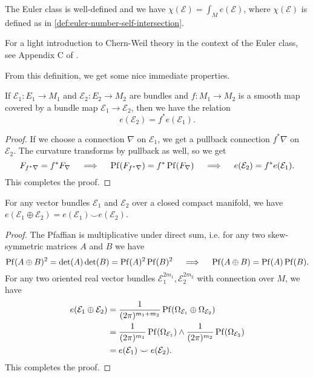 \begin{theorem}
  The Euler class is well-defined and we have $\chi(\mathcal{E})=\int_M e(\mathcal{E})$, where $\chi(\mathcal{E})$ is defined as in \cref{def:euler-number-self-intersection}.
\end{theorem}

For a light introduction to Chern-Weil theory in the context of the Euler class, see Appendix C of \cite{milnorstasheff1974}.

From this definition, we get some nice immediate properties. 
\begin{proposition}\label{prop:euler-class-naturality}
  If $\mathcal{E}_1 : E_1 \to M_1$ and $\mathcal{E}_2 : E_2 \to M_2$ are bundles and 
  $f : M_1 \to M_2$ is a smooth map covered by a bundle map $\mathcal{E}_1\to \mathcal{E}_2$, then we have the relation
  \[
      e(\mathcal{E}_2) = f^* e(\mathcal{E}_1).
  \]
\end{proposition}
\begin{proof}
  If we choose a connection $\nabla$ on $\mathcal{E}_1$, we get a pullback connection $f^*\nabla$ on $\mathcal{E}_2$. The curvature transforms by pullback as well, so we get
  \[
      F_{f^*\nabla} = f^* F_{\nabla} \quad\implies\quad \operatorname{Pf}(F_{f^*\nabla}) = f^*\operatorname{Pf}(F_\nabla) \quad\implies\quad e(\mathcal{E}_2) = f^* e(\mathcal{E}_1). 
  \]
  This completes the proof.
\end{proof}

\begin{proposition}
  For any vector bundles $\mathcal{E}_1$ and $\mathcal{E}_2$ over a closed compact manifold, we have $e(\mathcal{E}_1\oplus \mathcal{E}_2)=e(\mathcal{E}_1)\smile e(\mathcal{E}_2)$.
\end{proposition}
\begin{proof}
The Pfaffian is multiplicative under direct sum, i.e. for any two skew-symmetric matrices $A$ and $B$ we have
\[
  \operatorname{Pf}(A\oplus B)^2 = \det(A)\det(B) = \operatorname{Pf}(A)^2\operatorname{Pf}(B)^2
  \quad\implies\quad
  \operatorname{Pf}(A\oplus B) = \operatorname{Pf}(A)\operatorname{Pf}(B).
\]
For any two oriented real vector bundles $\mathcal{E}_1^{2m_1},\mathcal{E}_2^{2m_2}$ with connection over $M$, we have 
\[
  \begin{aligned}
  e(\mathcal{E}_1\oplus\mathcal{E}_2) 
  &= \frac{1}{(2\pi)^{m_1+m_2}} \operatorname{Pf}(\Omega_{\mathcal{E}_1}\oplus \Omega_{\mathcal{E}_2}) \\
  &= \frac{1}{(2\pi)^{m_1}} \operatorname{Pf}(\Omega_{\mathcal{E}_1}) \wedge
  \frac{1}{(2\pi)^{m_2}} \operatorname{Pf}(\Omega_{\mathcal{E}_2}) \\
  &= e(\mathcal{E}_1)\smile e(\mathcal{E}_2).
  \end{aligned}
\]
This completes the proof.
\end{proof}

